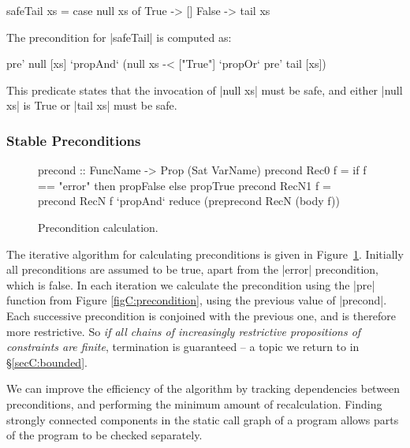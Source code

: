 \begin{example}
\label{exC:safeTail}
\begin{code}
safeTail xs = case  null xs of
                    True   -> []
                    False  -> tail xs
\end{code}

\noindent The precondition for |safeTail| is computed as:

\ignore\begin{code}
pre' null [xs] `propAnd` (null xs -< ["True"] `propOr` pre' tail [xs])
\end{code}

This predicate states that the invocation of |null xs| must be safe, and either |null xs| is True or |tail xs| must be safe.
\end{example}


\subsubsection{Stable Preconditions}
\label{secC:fixp_precond}


\begin{figure}
\ignore\begin{code}
precond  :: FuncName -> Prop (Sat VarName)
precond Rec0   f =  if f == "error" then propFalse else propTrue
precond RecN1  f =  precond RecN f `propAnd` reduce (pre{precond RecN} (body f))
\end{code}
\caption{Precondition calculation.}
\label{figC:precond_fixp}
\end{figure}

The iterative algorithm for calculating preconditions is given in Figure~\ref{figC:precond_fixp}. Initially all preconditions are assumed to be true, apart from the |error| precondition, which is false. In each iteration we calculate the precondition using the |pre| function from Figure \ref{figC:precondition}, using the previous value of |precond|. Each successive precondition is conjoined with the previous one, and is therefore more restrictive. So \textit{if all chains of increasingly restrictive propositions of constraints are finite}, termination is guaranteed -- a topic we return to in \S\ref{secC:bounded}.

We can improve the efficiency of the algorithm by tracking dependencies between preconditions, and performing the minimum amount of recalculation. Finding strongly connected components in the static call graph of a program allows parts of the program to be checked separately.

